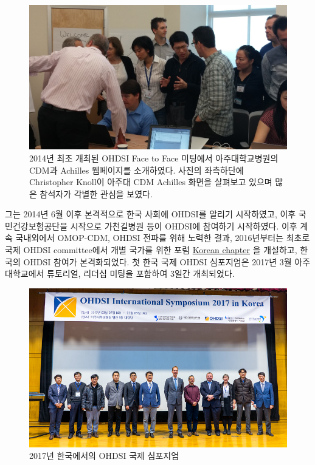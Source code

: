 \documentclass[10.5pt]{book}
\theoremstyle{definition}
\theoremstyle{definition}
\theoremstyle{definition}
\theoremstyle{remark}
\begin{document}
\begin{figure}

{\centering \includegraphics[width=1\linewidth]{images/OhdsiCommunity/2014f2fmeeting_korea} 

}

\caption{2014년 최초 개최된 OHDSI Face to Face 미팅에서 아주대학교병원의 CDM과 Achilles 웹페이지를 소개하였다. 사진의 좌측하단에 Christopher Knoll이 아주대 CDM Achilles 화면을 살펴보고 있으며 많은 참석자가 각별한 관심을 보였다.}\label{fig:OHDSIf2f2014}
\end{figure}

그는 2014년 6월 이후 본격적으로 한국 사회에 OHDSI를 알리기 시작하였고,
이후 국민건강보험공단을 시작으로 가천길병원 등이 OHDSI에 참여하기
시작하였다. 이후 계속 국내외에서 OMOP-CDM, OHDSI 전파를 위해 노력한
결과, 2016년부터는 최초로 국제 OHDSI committee에서 개별 국가를 위한 포럼
\href{http://forums.ohdsi.org/c/For-collaborators-wishing-to-communicate-in-Korean}{Korean
chapter} 을 개설하고, 한국의 OHDSI 참여가 본격화되었다. 첫 한국 국제
OHDSI 심포지엄은 2017년 3월 아주대학교에서 튜토리얼, 리더십 미팅을
포함하여 3일간 개최되었다.

\begin{figure}

{\centering \includegraphics[width=1.4\linewidth]{images/OhdsiCommunity/DSC01956} 

}

\caption{2017년 한국에서의 OHDSI 국제 심포지엄}\label{fig:OHDSIInternationalSymposium2017inKorea1}
\end{figure}
\end{document}
